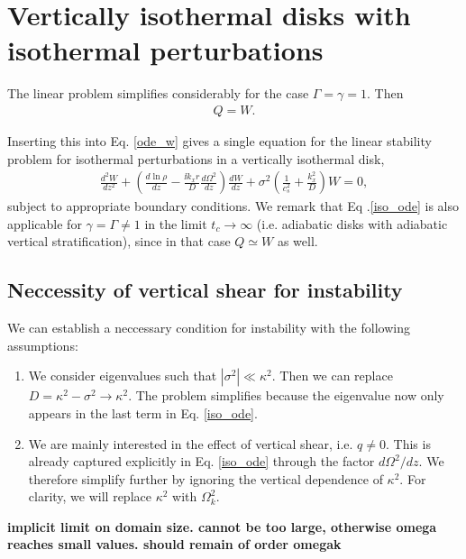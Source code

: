 \section{Vertically isothermal disks with 
  isothermal perturbations}
The linear problem simplifies considerably for the case
$\Gamma=\gamma=1$. Then 
\begin{align}
  Q=W. 
\end{align}

Inserting this into Eq. \ref{ode_w} gives a single equation for the linear stability
problem for isothermal perturbations in a vertically isothermal disk, 
\begin{align}\label{iso_ode}
  \frac{d^2W}{dz^2} + \left(\frac{d\ln{\rho}}{dz} - \frac{\ii k_x
      r}{D}\frac{d\Omega^2}{dz}\right) \frac{dW}{dz} +
  \sigma^2\left(\frac{1}{c_s^2} + \frac{k_x^2}{D}\right)W=0, 
\end{align} 
subject to appropriate boundary conditions. We remark that Eq
.\ref{iso_ode} is also applicable for    
$\gamma=\Gamma\neq 1$ in the limit $t_c\to\infty$ (i.e. adiabatic
disks with adiabatic vertical stratification), since in that case  
$Q\simeq W$ as well. 


\subsection{Neccessity of vertical shear for instability}\label{integral_relation}
We can establish a neccessary condition for instability with the
following assumptions:

\begin{enumerate}
\item We consider eigenvalues such that
  $|\sigma^2|\ll \kappa^2$. Then we can replace $D=\kappa^2 -\sigma^2\to
  \kappa^2$. The problem simplifies because the eigenvalue now only
  appears in the last term in Eq. \ref{iso_ode}. 
\item We are mainly interested in the effect of vertical shear, i.e. $q\neq
0$. This is already captured explicitly in Eq. \ref{iso_ode} through
the factor $d\Omega^2/dz$. We 
therefore simplify further by ignoring the vertical dependence of
$\kappa^2$. For clarity, we will replace  $\kappa^2$ with $\Omega_k^2$.  
\end{enumerate}

{\bf implicit limit on domain size. cannot be too large, otherwise omega reaches small values. should remain of order
omegak}

